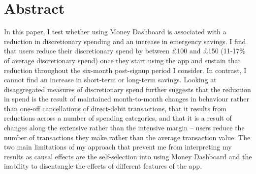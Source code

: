 
\section{Abstract}

In this paper, I test whether using Money Dashboard is associated with a
reduction in discretionary spending and an increase in emergency savings. I
find that users reduce their discretionary spend by between \pounds100 and
\pounds150 (11-17\% of average discretionary spend) once they start using the
app and sustain that reduction throughout the six-month post-signup period I
consider. In contrast, I cannot find an increase in short-term or long-term
savings. Looking at disaggregated measures of discretionary spend further
suggests that the reduction in spend is the result of maintained month-to-month
changes in behaviour rather than one-off cancellations of direct-debit
transactions, that it results from reductions across a number of spending
categories, and that it is a result of changes along the extensive rather than
the intensive margin -- users reduce the number of transactions they make
rather than the average transaction value. The two main limitations of my
approach that prevent me from interpreting my results as causal effects are the
self-selection into using Money Dashboard and the inability to disentangle the
effects of different features of the app.
